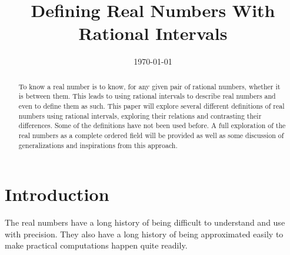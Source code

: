 \documentclass[12pt]{article}
\title{Defining Real Numbers With Rational Intervals}
\date{\today}
\begin{document}
\maketitle
\begin{abstract}
To know a real number is to know, for any given pair of rational numbers, whether it is between them. This leads to using rational intervals to describe real numbers and even to define them as such. This paper will explore several different definitions of real numbers using rational intervals, exploring their relations and contrasting their differences. Some of the definitions have not been used before. A full exploration of the real numbers as a complete ordered field will be provided as well as some discussion of generalizations and inspirations from this approach. 
\end{abstract}




\tableofcontents

\section{Introduction}

The real numbers have a long history of being difficult to understand and use with precision. They also have a long history of being approximated easily to make practical computations happen quite readily. 
\end{document}
